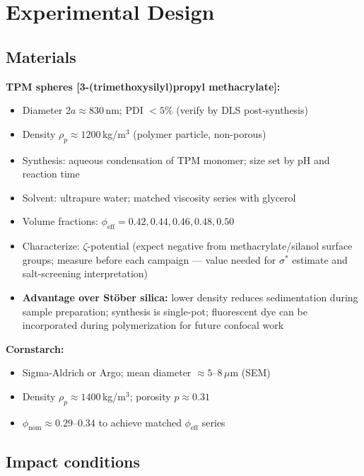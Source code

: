 \documentclass[11pt,letterpaper]{article}
\newcommand{\phieff}{\phi_{\mathrm{eff}}}
\newcommand{\phinom}{\phi_{\mathrm{nom}}}
\newcommand{\sigstar}{\sigma^*}
\begin{document}
\section{Experimental Design}

\subsection{Materials}

\noindent\textbf{TPM spheres [3-(trimethoxysilyl)propyl methacrylate]:}
\begin{itemize}[noitemsep,topsep=3pt]
  \item Diameter $2a \approx 830$\,nm; PDI $< 5\%$ (verify by DLS post-synthesis)
  \item Density $\rho_p \approx 1200$\,kg/m$^3$ (polymer particle, non-porous)
  \item Synthesis: aqueous condensation of TPM monomer; size set by pH and reaction
    time \cite{Sacanna2013}
  \item Solvent: ultrapure water; matched viscosity series with glycerol
  \item Volume fractions: $\phieff = 0.42, 0.44, 0.46, 0.48, 0.50$
  \item Characterize: $\zeta$-potential (expect negative from methacrylate/silanol
    surface groups; measure before each campaign --- value needed for $\sigstar$
    estimate and salt-screening interpretation)
  \item \textbf{Advantage over Stöber silica:} lower density reduces sedimentation
    during sample preparation; synthesis is single-pot; fluorescent dye can be
    incorporated during polymerization for future confocal work
\end{itemize}

\medskip
\noindent\textbf{Cornstarch:}
\begin{itemize}[noitemsep,topsep=3pt]
  \item Sigma-Aldrich or Argo; mean diameter ${\approx}5$--$8\,\mu$m (SEM)
  \item Density $\rho_p \approx 1400$\,kg/m$^3$; porosity $p \approx 0.31$ \cite{HanVanHa2017}
  \item $\phinom \approx 0.29$--$0.34$ to achieve matched $\phieff$ series
\end{itemize}

\subsection{Impact conditions}
\end{document}
